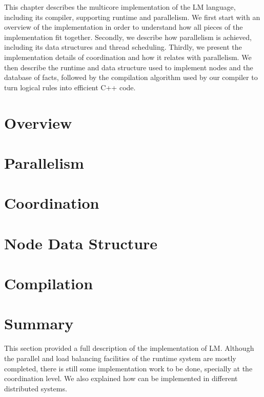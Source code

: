 This chapter describes the multicore implementation of the LM language,
including its compiler, supporting runtime and parallelism. We first start with
an overview of the implementation in order to understand how all pieces of the
implementation fit together. Secondly, we describe how parallelism is achieved,
including its data structures and thread scheduling. Thirdly, we present the
implementation details of coordination and how it relates with parallelism.  We
then describe the runtime and data structure used to implement nodes and the
database of facts, followed by the compilation algorithm used by our compiler to
turn logical rules into efficient C++ code.

\section{Overview}


\section{Parallelism}


\section{Coordination}


\section{Node Data Structure}\label{sec:data_structures}


\section{Compilation}


\section{Summary}

This section provided a full description of the implementation of LM. Although the parallel and load balancing facilities of the
runtime system are mostly completed, there is still some implementation work to be done, specially at the coordination level.
We also explained how \lang can be implemented in different distributed systems.
